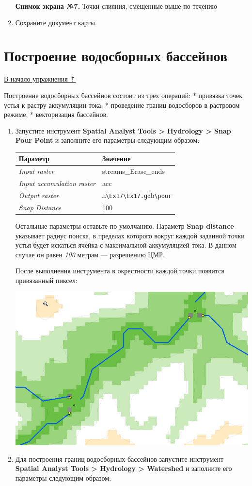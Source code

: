 \documentclass[]{book}
\theoremstyle{definition}
\theoremstyle{definition}
\theoremstyle{definition}
\theoremstyle{remark}
\begin{document}
\begin{enumerate}
  \textbf{Снимок экрана №7.} Точки слияния, смещенные выше по течению
\item
  Сохраните документ карты.
\end{enumerate}

\hypertarget{dem-watersheds}{%
\section{Построение водосборных бассейнов}\label{dem-watersheds}}

\protect\hyperlink{dem-analysis}{В начало упражнения ⇡}

Построение водосборных бассейнов состоит из трех операций: * привязка
точек устья к растру аккумуляции тока, * проведение границ водосборов в
растровом режиме, * векторизация бассейнов.

\begin{enumerate}
\def\labelenumi{\arabic{enumi}.}
\item
  Запустите инструмент \textbf{Spatial Analyst Tools \textgreater{}
  Hydrology \textgreater{} Snap Pour Point} и заполните его параметры
  следующим образом:

  \begin{longtable}[]{@{}ll@{}}
  \toprule
  Параметр & Значение\tabularnewline
  \midrule
  \endhead
  \emph{Input raster} & streams\_Erase\_ends\tabularnewline
  \emph{Input accumulation raster} & acc\tabularnewline
  \emph{Output raster} &
  \texttt{\ldots{}\textbackslash{}Ex17\textbackslash{}Ex17.gdb\textbackslash{}pour}\tabularnewline
  \emph{Snap Distance} & 100\tabularnewline
  \bottomrule
  \end{longtable}

  Остальные параметры оставьте по умолчанию. Параметр \textbf{Snap
  distance} указывает радиус поиска, в пределах которого вокруг каждой
  заданной точки устья будет искаться ячейка с максимальной аккумуляцией
  тока. В данном случае он равен \emph{100} метрам --- разрешению ЦМР.

  После выполнения инструмента в окрестности каждой точки появится
  привязанный пиксел:

  \includegraphics{images/Ex17/image23.png}
\item
  Для построения границ водосборных бассейнов запустите инструмент
  \textbf{Spatial Analyst Tools \textgreater{} Hydrology \textgreater{}
  Watershed} и заполните его параметры следующим образом:


\end{enumerate}
\end{document}
